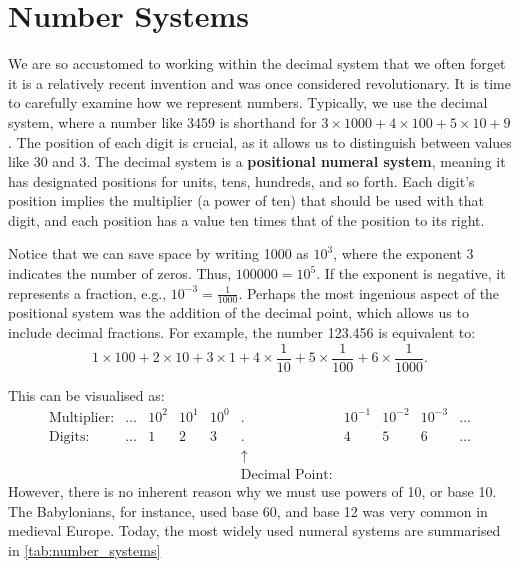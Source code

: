 \chapter{Number Systems}
\label{chap:ch2}

We are so accustomed to working within the decimal system that we often forget it is a relatively recent invention and was once considered revolutionary. It is time to carefully examine how we represent numbers. Typically, we use the decimal system, where a number like 3459 is shorthand for \(3 \times 1000 + 4 \times 100 + 5 \times 10 + 9\). The position of each digit is crucial, as it allows us to distinguish between values like 30 and 3. The decimal system is a\textbf{ positional numeral system}, meaning it has designated positions for units, tens, hundreds, and so forth. Each digit’s position implies the multiplier (a power of ten) that should be used with that digit, and each position has a value ten times that of the position to its right.

Notice that we can save space by writing 1000 as \(10^3\), where the exponent 3 indicates the number of zeros. Thus, \(100000 = 10^5\). If the exponent is negative, it represents a fraction, e.g., \(10^{-3} = \frac{1}{1000}\). Perhaps the most ingenious aspect of the positional system was the addition of the decimal point, which allows us to include decimal fractions. For example, the number 123.456 is equivalent to:
\[
1 \times 100 + 2 \times 10 + 3 \times 1 + 4 \times \frac{1}{10} + 5 \times \frac{1}{100} + 6 \times \frac{1}{1000}.
\]

This can be visualised as:
\[
\begin{array}{rccccccccc}
\text{Multiplier:} & \ldots & 10^2 & 10^1 & 10^0 & . & 10^{-1} & 10^{-2} & 10^{-3} & \ldots \\
\text{Digits:} & \ldots & 1 & 2 & 3 & . & 4 & 5 & 6 &\ldots \\
& & & & & \uparrow & & & & \\
& & & & & \text{Decimal Point:} & & & &
\end{array}
\]
However, there is no inherent reason why we must use powers of 10, or base 10. The Babylonians, for instance, used base 60, and base 12 was very common in medieval Europe. Today, the most widely used numeral systems are summarised in \autoref{tab:number_systems}

